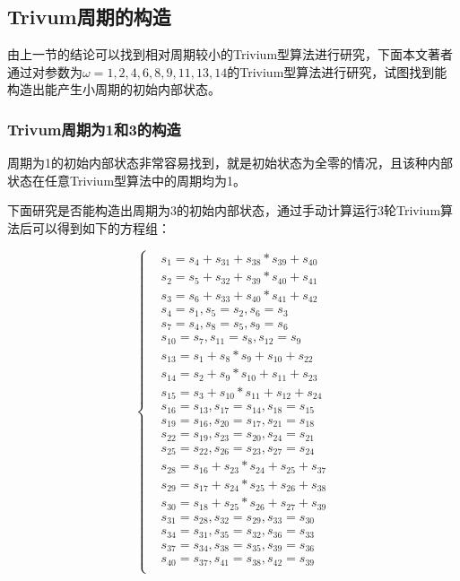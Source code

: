 \subsection{Trivum周期的构造}

由上一节的结论可以找到相对周期较小的Trivium型算法进行研究，下面本文著者通过对参数为$\omega={1, 2, 4, 6, 8, 9, 11, 13, 14}$的Trivium型算法进行研究，试图找到能构造出能产生小周期的初始内部状态。

\subsubsection{Trivum周期为1和3的构造}

周期为1的初始内部状态非常容易找到，就是初始状态为全零的情况，且该种内部状态在任意Trivium型算法中的周期均为1。

下面研究是否能构造出周期为3的初始内部状态，通过手动计算运行3轮Trivium算法后可以得到如下的方程组：

\begin{equation}
\label{eq:trivium_cycle_3_eg}
\left\{
\begin{aligned}
&s_{1}=s_{4}+s_{31}+s_{38}*s_{39}+s_{40}\\
&s_{2}=s_{5}+s_{32}+s_{39}*s_{40}+s_{41}\\
&s_{3}=s_{6}+s_{33}+s_{40}*s_{41}+s_{42}\\
&s_{4}=s_{1},s_{5}=s_{2},s_{6}=s_{3}\\
&s_{7}=s_{4},s_{8}=s_{5},s_{9}=s_{6}\\
&s_{10}=s_{7},s_{11}=s_{8},s_{12}=s_{9}\\
&s_{13}=s_{1}+s_{8}*s_{9}+s_{10}+s_{22}\\
&s_{14}=s_{2}+s_{9}*s_{10}+s_{11}+s_{23}\\
&s_{15}=s_{3}+s_{10}*s_{11}+s_{12}+s_{24}\\
&s_{16}=s_{13},s_{17}=s_{14},s_{18}=s_{15}\\
&s_{19}=s_{16},s_{20}=s_{17},s_{21}=s_{18}\\
&s_{22}=s_{19},s_{23}=s_{20},s_{24}=s_{21}\\
&s_{25}=s_{22},s_{26}=s_{23},s_{27}=s_{24}\\
&s_{28}=s_{16}+s_{23}*s_{24}+s_{25}+s_{37}\\
&s_{29}=s_{17}+s_{24}*s_{25}+s_{26}+s_{38}\\
&s_{30}=s_{18}+s_{25}*s_{26}+s_{27}+s_{39}\\
&s_{31}=s_{28},s_{32}=s_{29},s_{33}=s_{30}\\
&s_{34}=s_{31},s_{35}=s_{32},s_{36}=s_{33}\\
&s_{37}=s_{34},s_{38}=s_{35},s_{39}=s_{36}\\
&s_{40}=s_{37},s_{41}=s_{38},s_{42}=s_{39}\\
\end{aligned}
\right.
\end{equation}

